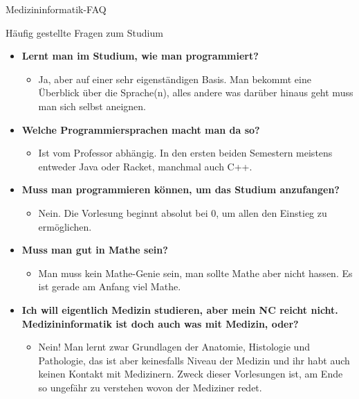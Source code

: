 \begin{Huge}
	Medizininformatik-FAQ
\end{Huge}
\begin{block}{Häufig gestellte Fragen zum Studium}
\begin{large}
\begin{itemize}
	\item \textbf{Lernt man im Studium, wie man programmiert?}
	\begin{itemize}
		\item Ja, aber auf einer sehr eigenständigen Basis. Man bekommt eine Überblick über die Sprache(n), alles andere was darüber hinaus geht muss man sich selbst aneignen.
	\end{itemize}
\end{itemize}
	
\begin{itemize}
	\item \textbf{Welche Programmiersprachen macht man da so?}
	\begin{itemize}
		\item Ist vom Professor abhängig. In den ersten beiden Semestern meistens entweder Java oder Racket, manchmal auch C++.
	\end{itemize}
\end{itemize}

\begin{itemize}
	\item \textbf{Muss man programmieren können, um das Studium anzufangen?}
	\begin{itemize}
		\item Nein. Die Vorlesung beginnt absolut bei 0, um allen den Einstieg zu ermöglichen.
	\end{itemize}
\end{itemize}

\begin{itemize}
	\item \textbf{Muss man gut in Mathe sein?}
	\begin{itemize}
		\item Man muss kein Mathe-Genie sein, man sollte Mathe aber nicht hassen. Es ist gerade am Anfang viel Mathe.
	\end{itemize}
\end{itemize}

\begin{itemize}
	\item \textbf{Ich will eigentlich Medizin studieren, aber mein NC reicht nicht. Medizininformatik ist doch auch was mit Medizin, oder?}
	\begin{itemize}
		\item Nein! Man lernt zwar Grundlagen der Anatomie, Histologie und Pathologie, das ist aber keinesfalls Niveau der Medizin und ihr habt auch keinen Kontakt mit Medizinern. Zweck dieser Vorlesungen ist, am Ende so ungefähr zu verstehen wovon der Mediziner redet.
	\end{itemize}
\end{itemize}


\end{large}
\end{block}
